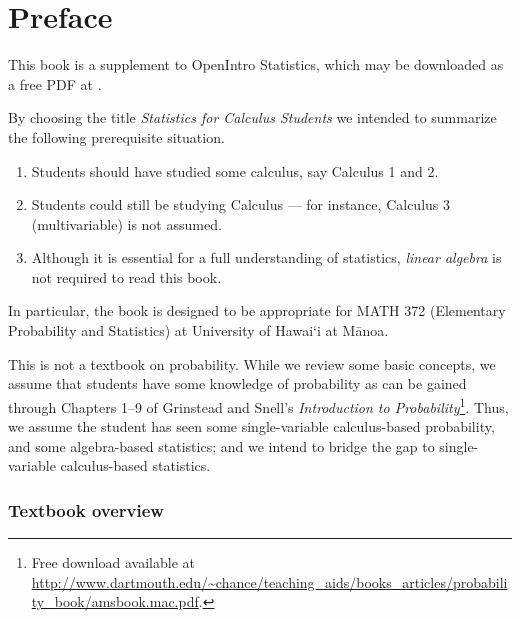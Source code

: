\chapter*{Preface}

This book is a supplement to OpenIntro Statistics, which may be downloaded as a free PDF at . \vspace{3mm}


\noindent By choosing the title \emph{Statistics for Calculus Students} we intended to summarize the following prerequisite situation.\vspace{-1mm}
\begin{enumerate}
\setlength{\itemsep}{0mm}
\item[(1)] Students should have studied some calculus, say Calculus 1 and 2.
\item[(2)] Students could still be studying Calculus --- for instance, Calculus 3 (multivariable) is not assumed.
\item[(3)] Although it is essential for a full understanding of statistics, \emph{linear algebra} is not required to read this book.
\end{enumerate}
In particular, the book is designed to be appropriate for MATH 372 (Elementary Probability and Statistics) at University of Hawai\textquoteleft i at M\=anoa.

\noindent This is not a textbook on probability. While we review some basic concepts, we assume that students have some knowledge of probability as can be gained through Chapters 1--9 of Grinstead and Snell's \emph{Introduction to Probability}\footnote{Free download available at \url{http://www.dartmouth.edu/~chance/teaching_aids/books_articles/probability_book/amsbook.mac.pdf}.}.
Thus, we assume the student has seen some single-variable calculus-based probability, and some algebra-based statistics; and we intend to bridge the gap to single-variable calculus-based statistics.

\subsection*{Textbook overview}

